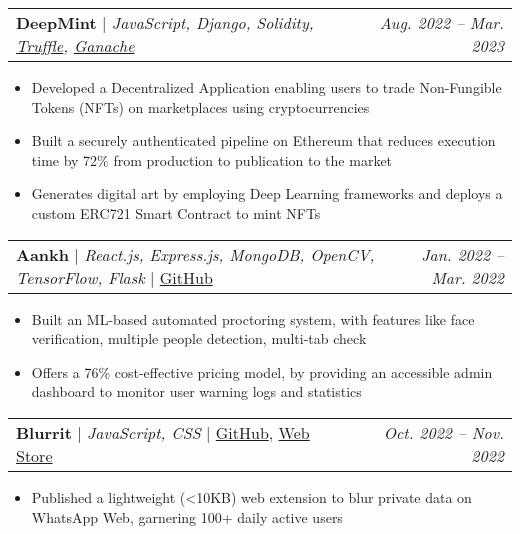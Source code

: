 \documentclass[letterpaper,10pt]{article}
\makeatletter
\newcommand{\resumeItem}[1]{
  \item\small{
    {#1 \vspace{-2pt}}
  }
}
\newcommand{\resumeProjectHeading}[2]{
    \item
    \begin{tabular*}{0.97\textwidth}{l@{\extracolsep{\fill}}r}
      #1 & \small\textit{#2} \\
    \end{tabular*}\vspace{-6pt}
}
\newcommand{\resumeItemListStart}{\begin{itemize}}
\newcommand{\resumeItemListEnd}{\end{itemize}\vspace{-5pt}}
\makeatother
\begin{document}
      \resumeProjectHeading {
            \textbf{DeepMint} 
            $|$ 
            \small
            {
                \emph{JavaScript, Django, Solidity, \href{https://trufflesuite.com}{Truffle}, \href{https://trufflesuite.com/ganache}{Ganache}}
            }
        }
        {Aug. 2022 -- Mar. 2023}
        \resumeItemListStart
            \resumeItem {
                Developed a Decentralized Application enabling users to trade Non-Fungible Tokens (NFTs) on marketplaces using cryptocurrencies 
            }
            \resumeItem {
                Built a securely authenticated pipeline on Ethereum that reduces execution time by 72\% from production to publication to the market
            }
            \resumeItem{
                Generates digital art by employing Deep Learning frameworks and deploys a custom ERC721 Smart Contract to mint NFTs
            }
        \resumeItemListEnd

        \resumeProjectHeading { 
            \textbf{Aankh} 
            $|$ 
            \small
            {
                \emph{React.js, Express.js, MongoDB, OpenCV, TensorFlow, Flask}
            }
            $|$ 
            \href{https://github.com/tusharnankani/Aankh}{GitHub}        
        }
        {Jan. 2022 -- Mar. 2022}
        \resumeItemListStart
            \resumeItem {
                Built an ML-based automated proctoring system, with features like face verification, multiple people detection, multi-tab check
            }
            \resumeItem {
                Offers a 76\% cost-effective pricing model, by providing an accessible admin dashboard to monitor user warning logs and statistics
            }
        \resumeItemListEnd

        \resumeProjectHeading { 
            \textbf{Blurrit} 
            $|$ 
            \small {   
                \emph{JavaScript, CSS}
            }
            $|$ 
            \href{https://github.com/tusharnankani/blurrit}{GitHub}, \href{https://chromewebstore.google.com/detail/blurrit/idknnkkejgomjlgbdpoblkfhhicekdjl}{Web Store}
        }
        {Oct. 2022 -- Nov. 2022}
        \resumeItemListStart
            \resumeItem {
                 Published a lightweight (<10KB) web extension to blur private data on WhatsApp Web, garnering 100+ daily active users
            }
        \resumeItemListEnd
\end{document}
